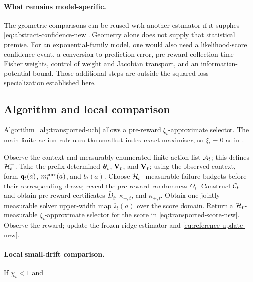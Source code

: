 \paragraph{What remains model-specific.}
The geometric comparisons can be reused with another estimator if it supplies
\eqref{eq:abstract-confidence-new}.  Geometry alone does not supply that
statistical premise.  For an exponential-family model, one would also need a
likelihood-score confidence event, a conversion to prediction error,
pre-reward collection-time Fisher weights, control of weight and Jacobian
transport, and an information-potential bound.  Those additional steps are
outside the squared-loss specialization established here.

\subsection{Algorithm and local comparison}

Algorithm~\ref{alg:transported-ucb} allows a pre-reward $\xi_t$-approximate
selector. The main finite-action rule uses the smallest-index exact maximizer,
so $\xi_t=0$ as in .

\begin{algorithm}[t]
\caption{Corrected-center specialization of transported UCB}\label{alg:transported-ucb}
\begin{algorithmic}[1]
\STATE Observe the context and measurably enumerated finite action list $\mathcal{A}_t$; this defines $\mathcal{H}_t^-$.
\STATE Take the prefix-determined $\boldsymbol{\theta}_t$, $\bar{\mathbf{V}}_t$, and $\mathbf{V}_t$; using the observed context, form $\mathbf{q}_t(a)$, $m_t^{\rm corr}(a)$, and $b_t(a)$.
\STATE Choose $\mathcal{H}_t^-$-measurable failure budgets before their corresponding draws; reveal the pre-reward randomness $\Omega_t$.
\STATE Construct $\mathcal{C}_t$ and obtain pre-reward certificates $\bar D_t$, $\kappa_{-,t}$, and $\kappa_{+,t}$.
\STATE Obtain one jointly measurable solver upper-width map $\hat s_t(a)$ over the score domain.
\STATE Return a $\mathcal{H}_t$-measurable $\xi_t$-approximate selector for the score in \eqref{eq:transported-score-new}.
\STATE Observe the reward; update the frozen ridge estimator and \eqref{eq:reference-update-new}.
\end{algorithmic}
\end{algorithm}

\paragraph{Local small-drift comparison.}
If $\chi_t<1$ and

